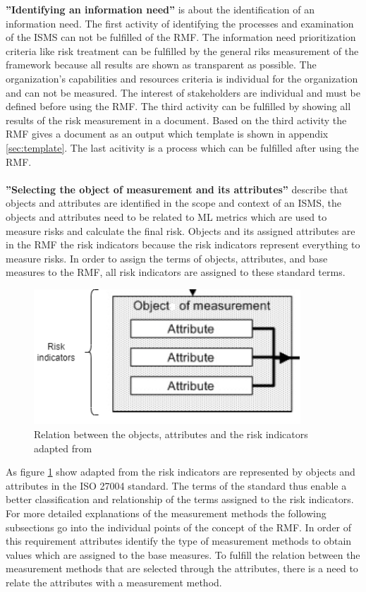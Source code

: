\textbf{''Identifying an information need''} is about the identification of an information need. The first activity of identifying the processes and examination of the ISMS can not be fulfilled of the RMF. The information need prioritization criteria like risk treatment can be fulfilled by the general riks measurement of the framework because all results are shown as transparent as possible. The organization's capabilities and resources criteria is individual for the organization and can not be measured. The interest of stakeholders are individual and must be defined before using the RMF. The third activity can be fulfilled by showing all results of the risk measurement in a document. Based on the third activity the RMF gives a document as an output which template is shown in appendix \ref{sec:template}. The last acitivity is a process which can be fulfilled after using the RMF. \\ \\

\textbf{''Selecting the object of measurement and its attributes''} describe that objects and attributes are identified in the scope and context of an ISMS, the objects and attributes need to be related to ML metrics which are used to measure risks and calculate the final risk. Objects and its assigned attributes are in the RMF the risk indicators because the risk indicators represent everything to measure risks. In order to assign the terms of objects, attributes, and base measures to the RMF, all risk indicators are assigned to these standard terms.

\begin{figure}[ht!]
  \centering
  \includegraphics[width=10cm]{pictures/relation_risk_ind.png}
  \caption{Relation between the objects, attributes and the risk indicators adapted from \cite{ISO_27004_2009}}
  \label{fig:relation_risk_ind}
\end{figure}

As figure \ref{fig:relation_risk_ind} show adapted from \cite{ISO_27004_2009} the risk indicators are represented by objects and attributes in the ISO 27004 \cite{ISO_27004_2009} standard.
The terms of the standard thus enable a better classification and relationship of the terms assigned to the risk indicators. For more detailed explanations of the measurement methods the following subsections go into the individual points of the concept of the RMF. In order of this requirement attributes identify the type of measurement methods to obtain values which are assigned to the base measures. To fulfill the relation between the measurement methods that are selected through the attributes, there is a need to relate the attributes with a measurement method. \\ \\

